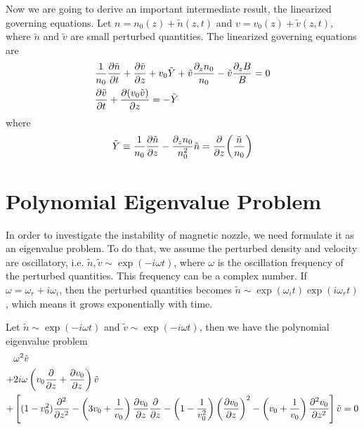 Now we are going to derive an important intermediate result, the linearized governing equations.
    Let $n = n_0(z) + \tilde{n}(z,t)$ and $v = v_0(z) + \tilde{v}(z,t)$, where $\tilde{n}$ and $\tilde{v}$ are small perturbed quantities. The linearized governing equations are
  \begin{align}
      &\frac{1}{n_0}\pdv{\tilde{n}}{t} 
      + \pdv{\tilde{v}}{z} + v_0\tilde{Y} + \tilde{v}\frac{\partial_z n_0}{n_0} - \tilde{v}\frac{\partial_z B}{B} = 0 
      \label{eq:linearized-conservation-of-mass}
      \\
      &\pdv{\tilde{v}}{t} + \pdv{(v_0\tilde{v})}{z} = -\tilde{Y}
      \label{eq:linearized-conservation-of-momentum}
  \end{align}
  where 
  \[ \tilde{Y} \equiv \frac{1}{n_0}\pdv{\tilde{n}}{z} - \frac{\partial_z n_0}{n_0^2}\tilde{n} = \pdv{z}(\frac{\tilde{n}}{n_0}) \]

\section{Polynomial Eigenvalue Problem}
In order to investigate the instability of magnetic nozzle, we need formulate it as an eigenvalue problem. To do that, we assume the perturbed density and velocity are oscillatory, i.e. $\tilde{n}, \tilde{v} \sim \exp(-i\omega t)$, where $\omega$ is the oscillation frequency of the perturbed quantities. This frequency can be a complex number. If $\omega = \omega_r +i \omega_i$, then the perturbed quantities becomes $\tilde{n} \sim \exp(\omega_i t)\exp(i\omega_r t)$, which means it grows exponentially with time.

Let $\tilde{n}\sim \exp(-i\omega t)$ and $\tilde{v} \sim \exp(-i\omega t)$, then we have the polynomial eigenvalue problem
\begin{equation}
  \begin{aligned}
    &\omega^2 \tilde{v} \\
    +& 2i\omega\left(v_0\pdv{}{z} + \pdv{v_0}{z}\right) \tilde{v} \\
    +& \left[ (1-v_0^2)\pdv[2]{}{z} 
      -\left(3v_0 + \frac{1}{v_0}\right)\pdv{v_0}{z}\pdv{}{z} 
      -\left(1-\frac{1}{v_0^2}\right)\left(\pdv{v_0}{z}\right)^2 
    - \left(v_0+\frac{1}{v_0}\right)\pdv[2]{v_0}{z} \right]\tilde{v}
    = 0
  \end{aligned}
  \label{eq:polynomial-eigenvalue-problem}
\end{equation}


